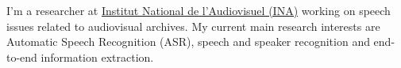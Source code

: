 
I'm a researcher at \href{https://www.ina.fr/institut-national-audiovisuel/research}{Institut National de l'Audiovisuel (INA)} working on speech issues related to audiovisual archives. My current main research interests are Automatic Speech Recognition (ASR), speech and speaker recognition and end-to-end information extraction.

